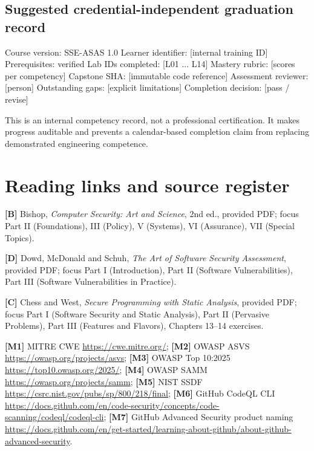 \documentclass[
  letterpaper,
]{article}
\newenvironment{Shaded}{}{}
\newcommand{\NormalTok}[1]{#1}
\begin{document}
\subsection{Suggested credential-independent graduation
record}\label{suggested-credential-independent-graduation-record}

\begin{Shaded}
\begin{Highlighting}[]
\NormalTok{Course version:       SSE{-}ASAS 1.0}
\NormalTok{Learner identifier:  [internal training ID]}
\NormalTok{Prerequisites:       verified}
\NormalTok{Lab IDs completed:  [L01 ... L14]}
\NormalTok{Mastery rubric:      [scores per competency]}
\NormalTok{Capstone SHA:        [immutable code reference]}
\NormalTok{Assessment reviewer: [person]}
\NormalTok{Outstanding gaps:    [explicit limitations]}
\NormalTok{Completion decision: [pass / revise]}
\end{Highlighting}
\end{Shaded}

This is an internal competency record, not a professional certification.
It makes progress auditable and prevents a calendar-based completion
claim from replacing demonstrated engineering competence.

\section{Reading links and source
register}\label{reading-links-and-source-register}

\textbf{{[}B{]}} Bishop, \emph{Computer Security: Art and Science}, 2nd
ed., provided PDF; focus Part II (Foundations), III (Policy), V
(Systems), VI (Assurance), VII (Special Topics).

\textbf{{[}D{]}} Dowd, McDonald and Schuh, \emph{The Art of Software
Security Assessment}, provided PDF; focus Part I (Introduction), Part II
(Software Vulnerabilities), Part III (Software Vulnerabilities in
Practice).

\textbf{{[}C{]}} Chess and West, \emph{Secure Programming with Static
Analysis}, provided PDF; focus Part I (Software Security and Static
Analysis), Part II (Pervasive Problems), Part III (Features and
Flavors), Chapters 13--14 exercises.

\textbf{{[}M1{]}} MITRE CWE \url{https://cwe.mitre.org/};
\textbf{{[}M2{]}} OWASP ASVS \url{https://owasp.org/projects/asvs};
\textbf{{[}M3{]}} OWASP Top 10:2025 \url{https://top10.owasp.org/2025/};
\textbf{{[}M4{]}} OWASP SAMM \url{https://owasp.org/projects/samm};
\textbf{{[}M5{]}} NIST SSDF
\url{https://csrc.nist.gov/pubs/sp/800/218/final}; \textbf{{[}M6{]}}
GitHub CodeQL CLI
\url{https://docs.github.com/en/code-security/concepts/code-scanning/codeql/codeql-cli};
\textbf{{[}M7{]}} GitHub Advanced Security product naming
\url{https://docs.github.com/en/get-started/learning-about-github/about-github-advanced-security}.
\end{document}
